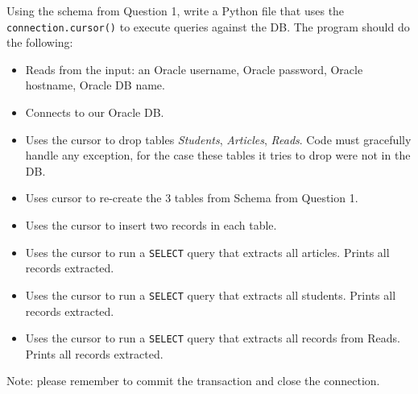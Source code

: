 \documentclass[letterpaper, 11pt]{article}
\begin{document}
Using the schema from Question 1, write a Python file that uses the \texttt{connection.cursor()} to execute queries against the DB. The program should do the following:
\begin{itemize}[label=-,leftmargin=*]
    \item Reads from the input: an Oracle username, Oracle password, Oracle hostname, Oracle DB name.
    \item Connects to our Oracle DB.
    \item Uses the cursor to drop tables \textit{Students}, \textit{Articles}, \textit{Reads}. Code must gracefully handle any exception, for the case these tables it tries to drop were not in the DB. 
    \item Uses cursor to re-create the 3 tables from Schema from Question 1.
    \item Uses the cursor to insert two records in each table.
    \item Uses the cursor to run a \texttt{SELECT} query that extracts all articles. Prints all records extracted.
    \item Uses the cursor to run a \texttt{SELECT} query that extracts all students. Prints all records extracted.
    \item Uses the cursor to run a \texttt{SELECT} query that extracts all records from Reads. Prints all records extracted.
\end{itemize}

Note: please remember to commit the transaction and close the connection.
\end{document}
